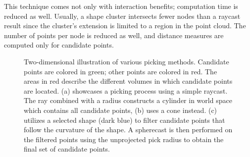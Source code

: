 This technique comes not only with interaction benefits; computation time is reduced as well. Usually, a shape cluster intersects fewer nodes than a raycast result since the cluster's extension is limited to a region in the point cloud. The number of points per node is reduced as well, and distance measures are computed only for candidate points. 
\\
\begin{figure}
\centering
{}\par\medskip
{}\par\medskip        
{}
\caption{Two-dimensional illustration of various picking methods. Candidate points are colored in green; other points are colored in red. The areas in red describe the different volumes in which candidate points are located. (a) showcases a picking process using a simple raycast. The ray combined with a radius constructs a cylinder in world space which contains all candidate points, (b) uses a cone instead. (c) utilizes a selected shape (dark blue) to filter candidate points that follow the curvature of the shape. A spherecast is then performed on the filtered points using the unprojected pick radius to obtain the final set of candidate points. }
\label{fig:picking_overview}
\end{figure}


